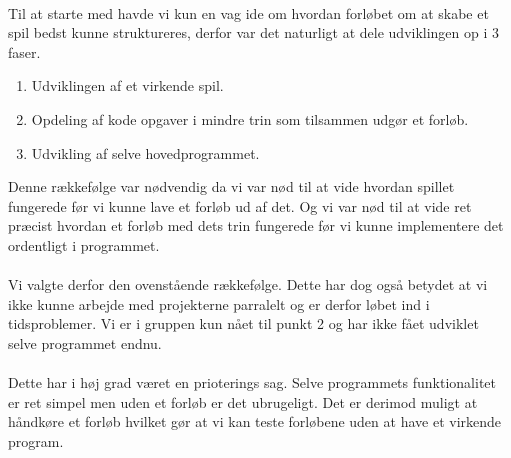 \documentclass[10pt,a4paper,danish]{article}
\begin{document}
\paragraph{}
Til at starte med havde vi kun en vag ide om hvordan forløbet om at skabe et spil bedst kunne struktureres, derfor var det naturligt at dele udviklingen op i 3 faser.
\begin{enumerate}
  \item Udviklingen af et virkende spil.
  \item Opdeling af kode opgaver i mindre trin som tilsammen udgør et forløb.
  \item Udvikling af selve hovedprogrammet.
\end{enumerate}
Denne rækkefølge var nødvendig da vi var nød til at vide hvordan spillet fungerede før vi kunne lave et forløb ud af det. Og vi var nød til at vide ret præcist hvordan et forløb med dets trin fungerede før vi kunne implementere det ordentligt i programmet.

\paragraph{}
Vi valgte derfor den ovenstående rækkefølge. Dette har dog også betydet at vi ikke kunne arbejde med projekterne parralelt og er derfor løbet ind i tidsproblemer. Vi er i gruppen kun nået til punkt 2 og har ikke fået udviklet selve programmet endnu.

\paragraph{}
Dette har i høj grad været en prioterings sag. Selve programmets funktionalitet er ret simpel men uden et forløb er det ubrugeligt. Det er derimod muligt at håndkøre et forløb hvilket gør at vi kan teste forløbene uden at have et virkende program.
\end{document}
